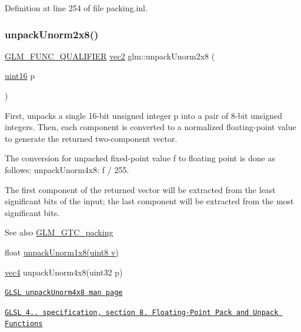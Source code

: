 Definition at line 254 of file packing.\+inl.

\mbox{\label{group__gtc__packing_ga96ce0c24339ee676e28a027fffd1edf6}} 
\subsubsection{\texorpdfstring{unpack\+Unorm2x8()}{unpackUnorm2x8()}}
{\footnotesize\ttfamily \hyperlink{setup_8hpp_a33fdea6f91c5f834105f7415e2a64407}{G\+L\+M\+\_\+\+F\+U\+N\+C\+\_\+\+Q\+U\+A\+L\+I\+F\+I\+ER} \hyperlink{group__core__types_gaa1618f51db67eaa145db101d8c8431d8}{vec2} glm\+::unpack\+Unorm2x8 (\begin{DoxyParamCaption}\item[{\hyperlink{group__gtc__type__precision_gad8c2939e1fdd8e5828b31d95c52255d5}{uint16}}]{p }\end{DoxyParamCaption})}

First, unpacks a single 16-\/bit unsigned integer p into a pair of 8-\/bit unsigned integers. Then, each component is converted to a normalized floating-\/point value to generate the returned two-\/component vector.

The conversion for unpacked fixed-\/point value f to floating point is done as follows\+: unpack\+Unorm4x8\+: f / 255.

The first component of the returned vector will be extracted from the least significant bits of the input; the last component will be extracted from the most significant bits.

\begin{DoxySeeAlso}{See also}
\hyperlink{group__gtc__packing}{G\+L\+M\+\_\+\+G\+T\+C\+\_\+packing} 

float \hyperlink{group__gtc__packing_ga32f3f2642df2ea87449d59fb614a8305}{unpack\+Unorm1x8(uint8 v)} 

\hyperlink{group__core__types_ga5881b1b022d7fd1b7218f5916532dd02}{vec4} unpack\+Unorm4x8(uint32 p) 

\href{http://www.opengl.org/sdk/docs/manglsl/xhtml/unpackUnorm4x8.xml}{\tt G\+L\+SL unpack\+Unorm4x8 man page} 

\href{http://www.opengl.org/registry/doc/GLSLangSpec.4.20.8.pdf}{\tt G\+L\+SL 4.. specification, section 8. Floating-\/\+Point Pack and Unpack Functions} 
\end{DoxySeeAlso}


